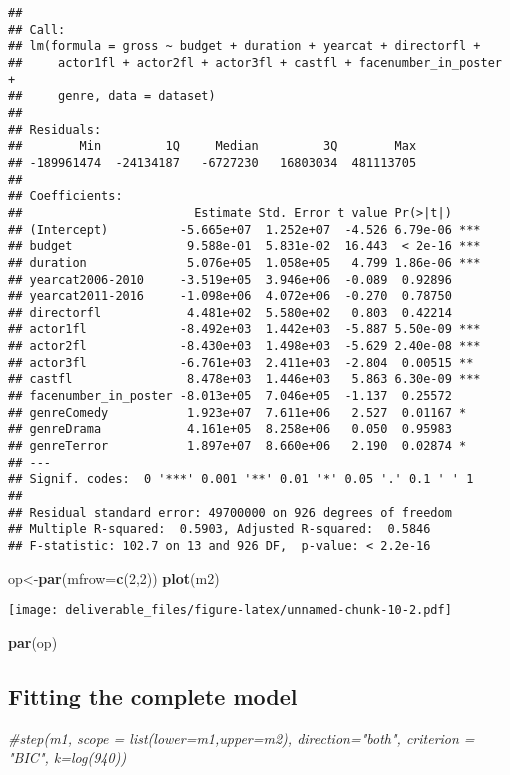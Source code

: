 \documentclass[]{article}
\newenvironment{Shaded}{\begin{snugshade}}{\end{snugshade}}
\newcommand{\KeywordTok}[1]{\textcolor[rgb]{0.13,0.29,0.53}{\textbf{#1}}}
\newcommand{\DataTypeTok}[1]{\textcolor[rgb]{0.13,0.29,0.53}{#1}}
\newcommand{\DecValTok}[1]{\textcolor[rgb]{0.00,0.00,0.81}{#1}}
\newcommand{\CommentTok}[1]{\textcolor[rgb]{0.56,0.35,0.01}{\textit{#1}}}
\newcommand{\NormalTok}[1]{#1}
\begin{document}
\begin{verbatim}
## 
## Call:
## lm(formula = gross ~ budget + duration + yearcat + directorfl + 
##     actor1fl + actor2fl + actor3fl + castfl + facenumber_in_poster + 
##     genre, data = dataset)
## 
## Residuals:
##        Min         1Q     Median         3Q        Max 
## -189961474  -24134187   -6727230   16803034  481113705 
## 
## Coefficients:
##                        Estimate Std. Error t value Pr(>|t|)    
## (Intercept)          -5.665e+07  1.252e+07  -4.526 6.79e-06 ***
## budget                9.588e-01  5.831e-02  16.443  < 2e-16 ***
## duration              5.076e+05  1.058e+05   4.799 1.86e-06 ***
## yearcat2006-2010     -3.519e+05  3.946e+06  -0.089  0.92896    
## yearcat2011-2016     -1.098e+06  4.072e+06  -0.270  0.78750    
## directorfl            4.481e+02  5.580e+02   0.803  0.42214    
## actor1fl             -8.492e+03  1.442e+03  -5.887 5.50e-09 ***
## actor2fl             -8.430e+03  1.498e+03  -5.629 2.40e-08 ***
## actor3fl             -6.761e+03  2.411e+03  -2.804  0.00515 ** 
## castfl                8.478e+03  1.446e+03   5.863 6.30e-09 ***
## facenumber_in_poster -8.013e+05  7.046e+05  -1.137  0.25572    
## genreComedy           1.923e+07  7.611e+06   2.527  0.01167 *  
## genreDrama            4.161e+05  8.258e+06   0.050  0.95983    
## genreTerror           1.897e+07  8.660e+06   2.190  0.02874 *  
## ---
## Signif. codes:  0 '***' 0.001 '**' 0.01 '*' 0.05 '.' 0.1 ' ' 1
## 
## Residual standard error: 49700000 on 926 degrees of freedom
## Multiple R-squared:  0.5903, Adjusted R-squared:  0.5846 
## F-statistic: 102.7 on 13 and 926 DF,  p-value: < 2.2e-16
\end{verbatim}

\begin{Shaded}
\begin{Highlighting}[]
\NormalTok{op<-}\KeywordTok{par}\NormalTok{(}\DataTypeTok{mfrow=}\KeywordTok{c}\NormalTok{(}\DecValTok{2}\NormalTok{,}\DecValTok{2}\NormalTok{))}
\KeywordTok{plot}\NormalTok{(m2)}
\end{Highlighting}
\end{Shaded}

\texttt{[image: deliverable\_files/figure-latex/unnamed-chunk-10-2.pdf]}

\begin{Shaded}
\begin{Highlighting}[]
\KeywordTok{par}\NormalTok{(op)}
\end{Highlighting}
\end{Shaded}

\subsection{Fitting the complete
model}\label{fitting-the-complete-model-1}

\begin{Shaded}
\begin{Highlighting}[]
\CommentTok{#step(m1, scope = list(lower=m1,upper=m2), direction="both", criterion = "BIC", k=log(940))}
\end{Highlighting}
\end{Shaded}
\end{document}
